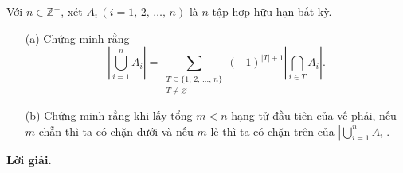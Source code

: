 \begin{tcolorbox}[breakable]
    \begin{baitoan}
        \label{pb:w01:01}
        Với $n \in \mathbb{Z^+}$, xét $A_i\,(i = 1,\,2,\,\ldots,\,n)$ là $n$ tập hợp hữu hạn bất kỳ. 
        
        \begin{enumerate}
            \item[(a)] Chứng minh rằng $$\left|\bigcup\limits_{i = 1}^n A_i\right| = \sum\limits_{\substack{T \subseteq \{1,\,2,\,\ldots,\,n\} \\ T \ne \varnothing}} (-1)^{|T| + 1} \left|\bigcap\limits_{i \in T} A_i\right|.$$
            \item[(b)] Chứng minh rằng khi lấy tổng $m < n$ hạng tử đầu tiên của vế phải, nếu $m$ chẵn thì ta có chặn dưới và nếu $m$ lẻ thì ta có chặn trên của $\displaystyle \left|\bigcup\limits_{i = 1}^n A_i\right|$.
        \end{enumerate}
    \end{baitoan}
\end{tcolorbox}

\textbf{Lời giải. }

